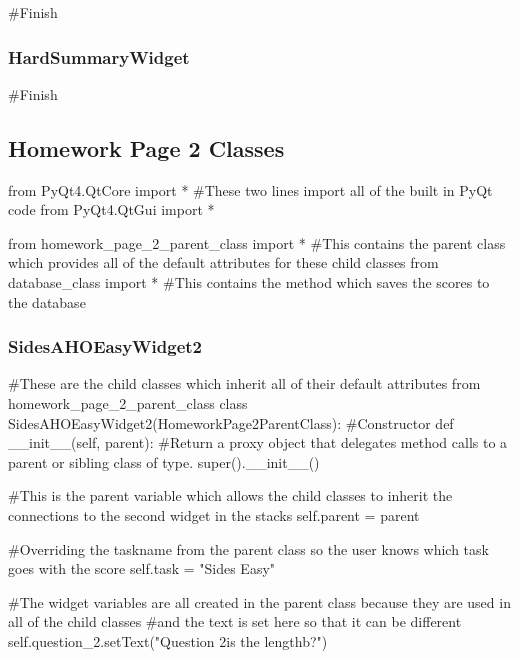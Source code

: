 \begin{landscape}
\begin{python}
#Finish
\end{python}

\subsubsection{HardSummaryWidget}

\begin{python}
#Finish
\end{python}

\subsection{Homework Page 2 Classes}

\begin{python}
from PyQt4.QtCore import * #These two lines import all of the built in PyQt code
from PyQt4.QtGui import *

from homework_page_2_parent_class import * #This contains the parent class which provides all of the default attributes for these child classes
from database_class import * #This contains the method which saves the scores to the database
\end{python}

\subsubsection{SidesAHOEasyWidget2}

\begin{python}
#These are the child classes which inherit all of their default attributes from homework_page_2_parent_class
class SidesAHOEasyWidget2(HomeworkPage2ParentClass):
    #Constructor
    def __init__(self, parent):
        #Return a proxy object that delegates method calls to a parent or sibling class of type.
        super().__init__()

        #This is the parent variable which allows the child classes to inherit the connections to the second widget in the stacks       
        self.parent = parent

        #Overriding the taskname from the parent class so the user knows which task goes with the score
        self.task = "Sides Easy"

        #The widget variables are all created in the parent class because they are used in all of the child classes
        #and the text is set here so that it can be different
        self.question_2.setText("Question 2\nWhat is the length\nof b?")
        

\end{python}
\end{landscape}
